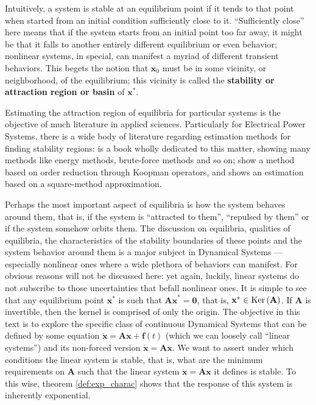 	Intuitively, a system is stable at an equilibrium point if it tends to that point when started from an initial condition sufficiently close to it. ``Sufficiently close'' here means that if the system starts from an initial point too far away, it might be that it falls to another entirely different equilibrium or even behavior; nonlinear systems, in special, can manifest a myriad of different transient behaviors. This begets the notion that $\mathbf{x}_0$ must be in some vicinity, or neighborhood, of the equilibrium; this vicinity is called the \textbf{stability or attraction region or basin}  of $\mathbf{x}^*$. 
	
	Estimating the attraction region of equilibria for particular systems is the objective of much literature in applied sciences. Particularly for Electrical Power Systems, there is a wide body of literature regarding estimation methods for finding stability regions: \cite{Chiang_Alberto_2015} is a book wholly dedicated to this matter, showing many methods like energy methods, brute-force methods and so on; \cite{10838245,EstimatingTransientStability2025} show a method based on order reduction through Koopman operators, and \cite{10038021} shows an estimation based on a square-method approximation.

	Perhaps the most important aspect of equilibria is how the system behaves around them, that is, if the system is ``attracted to them'', ``repulsed by them'' or if the system somehow orbits them. The discussion on equilibria, qualities of equilibria, the characteristics of the stability boundaries of these points and the system behavior around them is a major subject in Dynamical Systems — especially nonlinear ones where a wide plethora of behaviors can manifest. For obvious reasons will not be discussed here: yet again, luckily, linear systems do not subscribe to those uncertainties that befall nonlinear ones. It is simple to see that any equilibrium point $\mathbf{x}^*$ is such that $\mathbf{Ax}^* = \mathbf{0}$, that is, $\mathbf{x}^*\in\operatorname{Ker}\left(\mathbf{A}\right)$. If $\mathbf{A}$ is invertible, then the kernel is comprised of only the origin. The objective in this text is to explore the specific class of continuous Dynamical Systems that can be defined by some equation $\dot{\mathbf{x}} = \mathbf{Ax} + \mathbf{f}(t)$ (which we can loosely call ``linear systems'') and its non-forced version $\dot{\mathbf{x}} = \mathbf{Ax}$. We want to assert under which conditions the linear system is stable, that is, what are the minimum requirements on $\mathbf{A}$ such that the linear system $\dot{\mathbf{x}} = \mathbf{Ax}$ it defines is stable. To this wise, theorem \ref{def:exp_charac} shows that the response of this system is inherently exponential.

